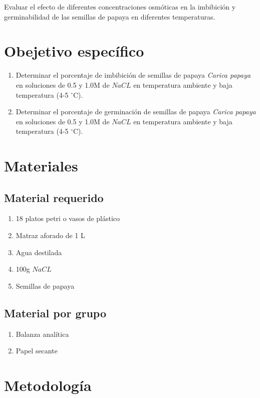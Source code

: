 Evaluar el efecto de diferentes concentraciones osm\'oticas en la imbibici\'on y germinabilidad de las semillas de papaya en diferentes temperaturas. 

\section{Obejetivo espec\'ifico}

\begin{enumerate}
	\item Determinar el porcentaje de imbibici\'on de semillas de papaya \textit{Carica papaya} en soluciones de 0.5 y 1.0M de $NaCL$ en temperatura ambiente y baja temperatura (4-5 $^\circ$C).
	\item Determinar el porcentaje de germinaci\'on de semillas de papaya \textit{Carica papaya} en soluciones de 0.5 y 1.0M de $NaCL$ en temperatura ambiente y baja temperatura (4-5 $^\circ$C).
\end{enumerate}

\section{Materiales}

\subsection{Material requerido }

\begin{enumerate}
	\item 18 platos petri o vasos de pl\'astico
	\item Matraz aforado de 1 L
	\item Agua destilada
	\item 100g $NaCL$
	\item Semillas de papaya
\end{enumerate}

\subsection{Material por grupo}

\begin{enumerate}
	\item Balanza anal\'itica
	\item Papel secante
\end{enumerate}

\section{Metodolog\'ia}

